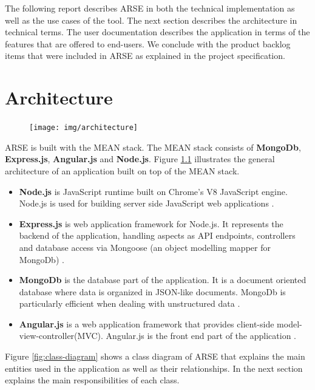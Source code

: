 \documentclass[
	accentcolor=tud1a %
]{tudreport}
\begin{document}
The following report describes ARSE in both the technical implementation as well as the use cases of the tool. The next section describes the architecture in technical terms. The user documentation describes the application in terms of the features that are offered to end-users. We conclude with the product backlog items that were included in ARSE as explained in the project specification. 

\chapter{Architecture}
\label{ch:architecture}

\begin{figure}
  \centering
    \texttt{[image: img/architecture]}
    \label{fig:architecture}
\end{figure}
ARSE is built with the MEAN stack. The MEAN stack consists of \textbf{MongoDb}, \textbf{Express.js}, \textbf{Angular.js} and \textbf{Node.js}. Figure \ref{fig:architecture} illustrates the general architecture of an application built on top of the MEAN stack.

\begin{itemize}
\item \textbf{Node.js} is JavaScript runtime built on Chrome's V8 JavaScript engine. Node.js is used for building server side JavaScript web applications \cite{NJS}.
\item \textbf{Express.js} is web application framework for Node.js. It represents the backend of the application, handling aspects as API endpoints, controllers and database access via Mongoose (an object modelling mapper for MongoDb) \cite{EXJS}.
\item \textbf{MongoDb} is the database part of the application. It is a document oriented database where data is organized in JSON-like documents. MongoDb is particularly efficient when dealing with unstructured data \cite{MDB}.
\item \textbf{Angular.js} is a web application framework that provides client-side model-view-controller(MVC). Angular.js is the front end part of the application \cite{AJS}.

\end{itemize}

Figure \ref{fig:class-diagram} shows a class diagram of ARSE that explains the main entities used in the application as well as their relationships. In the next section explains the main responsibilities of each class. 
\end{document}
